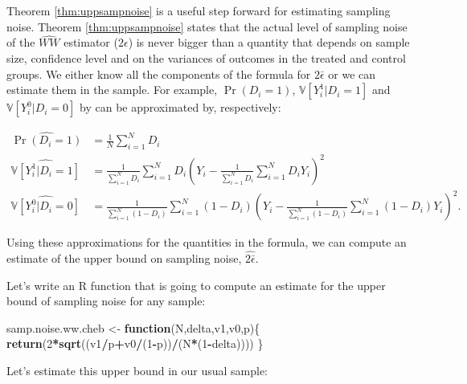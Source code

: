\documentclass[]{book}
\newenvironment{Shaded}{\begin{snugshade}}{\end{snugshade}}
\newcommand{\KeywordTok}[1]{\textcolor[rgb]{0.13,0.29,0.53}{\textbf{#1}}}
\newcommand{\DecValTok}[1]{\textcolor[rgb]{0.00,0.00,0.81}{#1}}
\newcommand{\StringTok}[1]{\textcolor[rgb]{0.31,0.60,0.02}{#1}}
\newcommand{\ControlFlowTok}[1]{\textcolor[rgb]{0.13,0.29,0.53}{\textbf{#1}}}
\newcommand{\OperatorTok}[1]{\textcolor[rgb]{0.81,0.36,0.00}{\textbf{#1}}}
\newcommand{\NormalTok}[1]{#1}
\newcommand{\var}[1]{\mathbb{V}[ #1 ]}
\theoremstyle{definition}
\theoremstyle{definition}
\theoremstyle{definition}
\theoremstyle{remark}
\let\BeginKnitrBlock\begin \let\EndKnitrBlock\end
\begin{document}
Theorem \ref{thm:uppsampnoise} is a useful step forward for estimating
sampling noise. Theorem \ref{thm:uppsampnoise} states that the actual
level of sampling noise of the \(\hat{WW}\) estimator (\(2\epsilon\)) is
never bigger than a quantity that depends on sample size, confidence
level and on the variances of outcomes in the treated and control
groups. We either know all the components of the formula for
\(2\bar{\epsilon}\) or we can estimate them in the sample. For example,
\(\Pr(D_i=1)\), \(\var{Y_i^1|D_i=1}\) and \(\var{Y_i^0|D_i=0}\) by can
be approximated by, respectively:

\begin{align*}
  \hat{\Pr(D_i=1)} & = \frac{1}{N}\sum_{i=1}^ND_i\\
  \hat{\var{Y_i^1|D_i=1}} & = \frac{1}{\sum_{i=1}^ND_i}\sum_{i=1}^ND_i(Y_i-\frac{1}{\sum_{i=1}^ND_i}\sum_{i=1}^ND_iY_i)^2\\
  \hat{\var{Y_i^0|D_i=0}} & = \frac{1}{\sum_{i=1}^N(1-D_i)}\sum_{i=1}^N(1-D_i)(Y_i-\frac{1}{\sum_{i=1}^N(1-D_i)}\sum_{i=1}^N(1-D_i)Y_i)^2.
\end{align*}

Using these approximations for the quantities in the formula, we can
compute an estimate of the upper bound on sampling noise,
\(\hat{2\bar{\epsilon}}\).

\BeginKnitrBlock{example}
\protect\hypertarget{exm:unnamed-chunk-47}{}{\label{exm:unnamed-chunk-47}
}Let's write an R function that is going to compute an estimate for the
upper bound of sampling noise for any sample:
\EndKnitrBlock{example}

\begin{Shaded}
\begin{Highlighting}[]
\NormalTok{samp.noise.ww.cheb <-}\StringTok{ }\ControlFlowTok{function}\NormalTok{(N,delta,v1,v0,p)\{}
  \KeywordTok{return}\NormalTok{(}\DecValTok{2}\OperatorTok{*}\KeywordTok{sqrt}\NormalTok{((v1}\OperatorTok{/}\NormalTok{p}\OperatorTok{+}\NormalTok{v0}\OperatorTok{/}\NormalTok{(}\DecValTok{1}\OperatorTok{-}\NormalTok{p))}\OperatorTok{/}\NormalTok{(N}\OperatorTok{*}\NormalTok{(}\DecValTok{1}\OperatorTok{-}\NormalTok{delta))))}
\NormalTok{\}}
\end{Highlighting}
\end{Shaded}

Let's estimate this upper bound in our usual sample:
\end{document}
